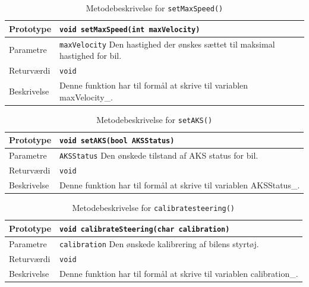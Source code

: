 \begin{table}[h]
\begin{tabularx}{\textwidth}{| L{2.5 cm} | Z |} \hline
Prototype 	& \texttt{void setMaxSpeed(int maxVelocity)} \\\hline
Parametre 	& \texttt{maxVelocity}		\newline Den hastighed der ønskes sættet til maksimal hastighed for bil.\\\hline
Returværdi	& \texttt{void} 			\newline \\\hline
Beskrivelse	& Denne funktion har til formål at skrive til variablen maxVelocity\_. \newline \\\hline
\end{tabularx}
\caption{Metodebeskrivelse for \texttt{setMaxSpeed()}}
\label{table:met_setmaxspeed}
\end{table}

\begin{table}[h]
\begin{tabularx}{\textwidth}{| L{2.5 cm} | Z |} \hline
Prototype 	& \texttt{void setAKS(bool AKSStatus)} \\\hline
Parametre 	& \texttt{AKSStatus}		\newline Den ønskede tilstand af AKS status for bil.\\\hline
Returværdi	& \texttt{void} 			\newline \\\hline
Beskrivelse	& Denne funktion har til formål at skrive til variablen AKSStatus\_.\newline \\\hline
\end{tabularx}
\caption{Metodebeskrivelse for \texttt{setAKS()}}
\label{table:met_setaks}
\end{table}

\begin{table}[h]
\begin{tabularx}{\textwidth}{| L{2.5 cm} | Z |} \hline
Prototype 	& \texttt{void calibrateSteering(char calibration)} \\\hline
Parametre 	& \texttt{calibration}		\newline Den ønskede kalibrering af bilens styrtøj.\\\hline
Returværdi	& \texttt{void} 			\newline \\\hline
Beskrivelse	& Denne funktion har til formål at skrive til variablen calibration\_.\newline \\\hline
\end{tabularx}
\caption{Metodebeskrivelse for \texttt{calibratesteering()}}
\label{table:met_calibratesteering}
\end{table}


